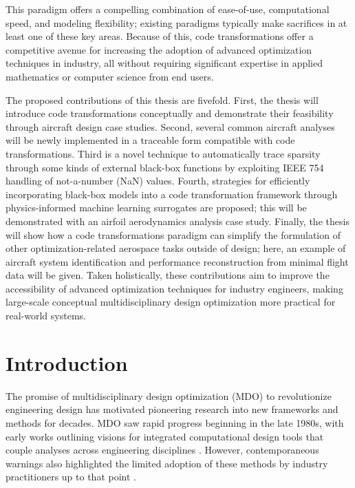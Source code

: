 \documentclass[12pt,vi,oneside,table]{report}
\begin{document}
    This paradigm offers a compelling combination of ease-of-use, computational speed, and modeling flexibility; existing paradigms typically make sacrifices in at least one of these key areas. Because of this, code transformations offer a competitive avenue for increasing the adoption of advanced optimization techniques in industry, all without requiring significant expertise in applied mathematics or computer science from end users.

    The proposed contributions of this thesis are fivefold. First, the thesis will introduce code transformations conceptually and demonstrate their feasibility through aircraft design case studies. Second, several common aircraft analyses will be newly implemented in a traceable form compatible with code transformations. Third is a novel technique to automatically trace sparsity through some kinds of external black-box functions by exploiting IEEE 754 handling of not-a-number (NaN) values. Fourth, strategies for efficiently incorporating black-box models into a code transformation framework through physics-informed machine learning surrogates are proposed; this will be demonstrated with an airfoil aerodynamics analysis case study. Finally, the thesis will show how a code transformations paradigm can simplify the formulation of other optimization-related aerospace tasks outside of design; here, an example of aircraft system identification and performance reconstruction from minimal flight data will be given. Taken holistically, these contributions aim to improve the accessibility of advanced optimization techniques for industry engineers, making large-scale conceptual multidisciplinary design optimization more practical for real-world systems.

    \tableofcontents


    \chapter{Introduction}
    \label{chap:intro}

    The promise of multidisciplinary design optimization (MDO) to revolutionize engineering design has motivated pioneering research into new frameworks and methods for decades. MDO saw rapid progress beginning in the late 1980s, with early works outlining visions for integrated computational design tools that couple analyses across engineering disciplines \cite{ashley_making_1982, vanderplaats_automated_1976, haftka_multidisciplinary_1997}. However, contemporaneous warnings also highlighted the limited adoption of these methods by industry practitioners up to that point \cite{kroo_multidisciplinary_1997, drela_pros_1998}.
\end{document}
